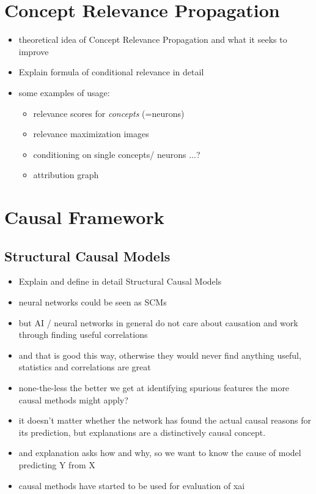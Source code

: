 \section{Concept Relevance Propagation}
\begin{itemize}
    \item theoretical idea of Concept Relevance Propagation and what it seeks to improve
    \item Explain formula of conditional relevance in detail
    \item some examples of usage:
    \begin{itemize}
        \item relevance scores for \textit{concepts} (=neurons)
        \item relevance maximization images
        \item conditioning on single concepts/ neurons ...? 
        \item attribution graph 
    \end{itemize}
\end{itemize}


\section{Causal Framework}
\subsection{Structural Causal Models}

\begin{itemize}
    \item Explain and define in detail Structural Causal Models
    \item neural networks could be seen as SCMs \cite{Chattopadhyay2019}
    \item but AI / neural networks in general do not care about causation and work through finding useful correlations
    \item and that is good this way, otherwise they would never find anything useful, statistics and correlations are great
    \item none-the-less the better we get at identifying spurious features the more causal methods might apply? 
    \item it doesn't matter whether the network has found the actual causal reasons for its prediction, but explanations are a distinctively causal concept.
    \item and explanation asks how and why, so we want to know the cause of model predicting Y from X
    \item causal methods have started to be used for evaluation of xai
\end{itemize}

